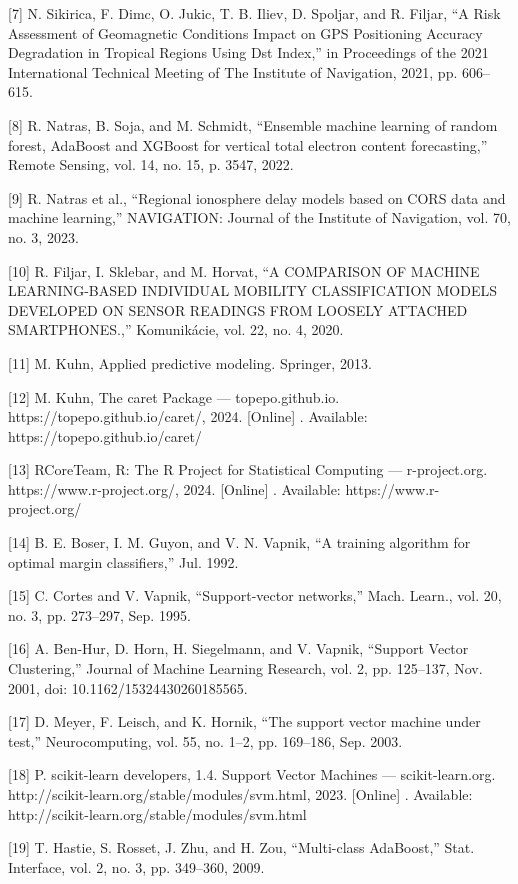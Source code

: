 \documentclass[sn-mathphys-num]{sn-jnl}%
\begin{document}
[7] N. Sikirica, F. Dimc, O. Jukic, T. B. Iliev, D. Spoljar, and R. Filjar, “A Risk Assessment of Geomagnetic Conditions Impact on GPS Positioning Accuracy Degradation in Tropical Regions Using Dst Index,” in Proceedings of the 2021 International Technical Meeting of The Institute of Navigation, 2021, pp. 606–615.

[8] R. Natras, B. Soja, and M. Schmidt, “Ensemble machine learning of random forest, AdaBoost and XGBoost for vertical total electron content forecasting,” Remote Sensing, vol. 14, no. 15, p. 3547, 2022.

[9] R. Natras et al., “Regional ionosphere delay models based on CORS data and machine learning,” NAVIGATION: Journal of the Institute of Navigation, vol. 70, no. 3, 2023.

[10] R. Filjar, I. Sklebar, and M. Horvat, “A COMPARISON OF MACHINE LEARNING-BASED INDIVIDUAL MOBILITY CLASSIFICATION MODELS DEVELOPED ON SENSOR READINGS FROM LOOSELY ATTACHED SMARTPHONES.,” Komunikácie, vol. 22, no. 4, 2020.

[11] M. Kuhn, Applied predictive modeling. Springer, 2013.

[12] M. Kuhn, The caret Package — topepo.github.io. https://topepo.github.io/caret/, 2024. [Online] . Available: https://topepo.github.io/caret/

[13] RCoreTeam, R: The R Project for Statistical Computing — r-project.org. https://www.r-project.org/, 2024. [Online] . Available: https://www.r-project.org/

[14] B. E. Boser, I. M. Guyon, and V. N. Vapnik, “A training algorithm for optimal margin classifiers,” Jul. 1992.

[15] C. Cortes and V. Vapnik, “Support-vector networks,” Mach. Learn., vol. 20, no. 3, pp. 273–297, Sep. 1995.

[16] A. Ben-Hur, D. Horn, H. Siegelmann, and V. Vapnik, “Support Vector Clustering,” Journal of Machine Learning Research, vol. 2, pp. 125–137, Nov. 2001, doi: 10.1162/15324430260185565.

[17] D. Meyer, F. Leisch, and K. Hornik, “The support vector machine under test,” Neurocomputing, vol. 55, no. 1–2, pp. 169–186, Sep. 2003.

[18] P. scikit-learn developers, 1.4. Support Vector Machines — scikit-learn.org. http://scikit-learn.org/stable/modules/svm.html, 2023. [Online] . Available: http://scikit-learn.org/stable/modules/svm.html

[19] T. Hastie, S. Rosset, J. Zhu, and H. Zou, “Multi-class AdaBoost,” Stat. Interface, vol. 2, no. 3, pp. 349–360, 2009.
\end{document}
